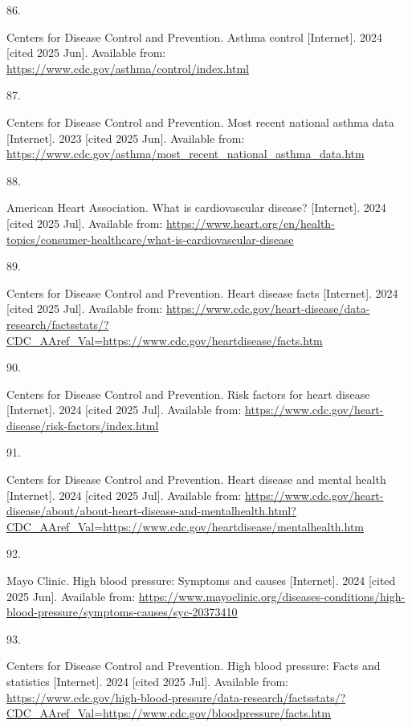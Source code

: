 \documentclass[
  english,
  letterpaper,
]{report}
\newlength{\cslhangindent}
\newlength{\csllabelwidth}
\newenvironment{CSLReferences}[2] %
 {\begin{list}{}{%
  \setlength{\itemindent}{0pt}
  \setlength{\leftmargin}{0pt}
  \setlength{\parsep}{0pt}
  \ifodd #1
   \setlength{\leftmargin}{\cslhangindent}
   \setlength{\itemindent}{-1\cslhangindent}
  \fi
  \setlength{\itemsep}{#2\baselineskip}}}
 {\end{list}}
\newcommand{\CSLLeftMargin}[1]{\parbox[t]{\csllabelwidth}{\strut#1\strut}}
\newcommand{\CSLRightInline}[1]{\parbox[t]{\linewidth - \csllabelwidth}{\strut#1\strut}}
\begin{document}
\begin{CSLReferences}{0}{1}
\CSLLeftMargin{86. }%
\CSLRightInline{Centers for Disease Control and Prevention. Asthma
control {[}Internet{]}. 2024 {[}cited 2025 Jun{]}. Available from:
\url{https://www.cdc.gov/asthma/control/index.html}}

\CSLLeftMargin{87. }%
\CSLRightInline{Centers for Disease Control and Prevention. Most recent
national asthma data {[}Internet{]}. 2023 {[}cited 2025 Jun{]}.
Available from:
\url{https://www.cdc.gov/asthma/most_recent_national_asthma_data.htm}}

\CSLLeftMargin{88. }%
\CSLRightInline{American Heart Association. What is cardiovascular
disease? {[}Internet{]}. 2024 {[}cited 2025 Jul{]}. Available from:
\url{https://www.heart.org/en/health-topics/consumer-healthcare/what-is-cardiovascular-disease}}

\CSLLeftMargin{89. }%
\CSLRightInline{Centers for Disease Control and Prevention. Heart
disease facts {[}Internet{]}. 2024 {[}cited 2025 Jul{]}. Available from:
\url{https://www.cdc.gov/heart-disease/data-research/factsstats/?CDC_AAref_Val=https://www.cdc.gov/heartdisease/facts.htm}}

\CSLLeftMargin{90. }%
\CSLRightInline{Centers for Disease Control and Prevention. Risk factors
for heart disease {[}Internet{]}. 2024 {[}cited 2025 Jul{]}. Available
from: \url{https://www.cdc.gov/heart-disease/risk-factors/index.html}}

\CSLLeftMargin{91. }%
\CSLRightInline{Centers for Disease Control and Prevention. Heart
disease and mental health {[}Internet{]}. 2024 {[}cited 2025 Jul{]}.
Available from:
\url{https://www.cdc.gov/heart-disease/about/about-heart-disease-and-mentalhealth.html?CDC_AAref_Val=https://www.cdc.gov/heartdisease/mentalhealth.htm}}

\CSLLeftMargin{92. }%
\CSLRightInline{Mayo Clinic. High blood pressure: Symptoms and causes
{[}Internet{]}. 2024 {[}cited 2025 Jun{]}. Available from:
\url{https://www.mayoclinic.org/diseases-conditions/high-blood-pressure/symptoms-causes/syc-20373410}}

\CSLLeftMargin{93. }%
\CSLRightInline{Centers for Disease Control and Prevention. High blood
pressure: Facts and statistics {[}Internet{]}. 2024 {[}cited 2025
Jul{]}. Available from:
\url{https://www.cdc.gov/high-blood-pressure/data-research/factsstats/?CDC_AAref_Val=https://www.cdc.gov/bloodpressure/facts.htm}}


\end{CSLReferences}
\end{document}
